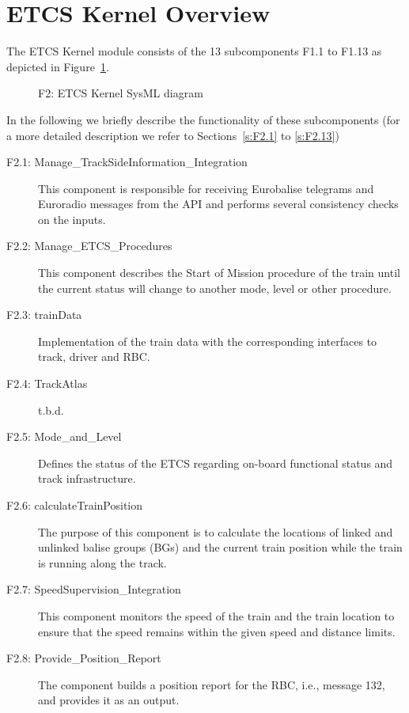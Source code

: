 \section{ETCS Kernel Overview}\label{s:ETCS_Kernel_Overview}

The ETCS Kernel module consists of the 13 subcomponents F1.1 to F1.13 as depicted in Figure~\ref{f:ETCS_Kernel}. 
\begin{figure}
\center
{}
\caption{F2: ETCS Kernel SysML diagram}\label{f:ETCS_Kernel}
\end{figure}
In the following we briefly describe the functionality of these subcomponents (for a more detailed description we refer to Sections~\ref{s:F2.1} to \ref{s:F2.13})
\begin{description}
\item[F2.1: Manage\_TrackSideInformation\_Integration] This component is responsible for receiving Eurobalise telegrams and Euroradio messages from the API and performs several consistency checks on the inputs.
\item[F2.2: Manage\_ETCS\_Procedures] This component describes the Start of Mission procedure of the train until the current status will change to another mode, level or other procedure.
\item[F2.3: trainData] Implementation of the train data with the corresponding interfaces to track, driver and RBC.
\item[F2.4: TrackAtlas] t.b.d.
\item[F2.5: Mode\_and\_Level] Defines the status of the ETCS
regarding on-board functional status and track infrastructure.
\item[F2.6: calculateTrainPosition] The purpose of this component is to calculate the locations of linked and unlinked balise groups (BGs) and the current train position while the train is running along the track.
\item[F2.7: SpeedSupervision\_Integration] This component monitors the speed of the train and the train location to ensure that the speed remains within the given speed and distance limits.
\item[F2.8: Provide\_Position\_Report] The component builds a position report for the RBC, i.e., message 132, and provides it as an output.

\end{description}
